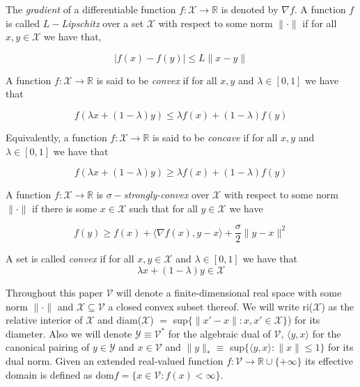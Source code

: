 The \textit{gradient} of a differentiable function $f: \mathcal{X} \to \mathbb{R}$ is denoted by $\nabla f$. A function $f$ is called $L-$\textit{Lipschitz} over a set $\mathcal{X}$ with respect to some norm $\|\cdot\|$ if for all $x,y \in \mathcal{X}$ we have that, 

\begin{equation*}
    |f(x) - f(y)| \le L\|x - y\|
\end{equation*}

A function $f:\mathcal{X} \to \mathbb{R}$ is said to be \textit{convex} if for all $x,y$ and $\lambda \in [0,1]$ we have that 

\begin{equation*}
    f(\lambda x + (1-\lambda)y) \le \lambda f(x) + (1-\lambda)f(y)
\end{equation*}

Equivalently, a function $f:\mathcal{X} \to \mathbb{R}$ is said to be \textit{concave} if for all $x,y$ and $\lambda \in [0,1]$ we have that 

\begin{equation*}
    f(\lambda x + (1-\lambda)y) \ge \lambda f(x) + (1-\lambda)f(y)
\end{equation*}

A function $f:\mathcal{X} \to \mathbb{R}$ is $\sigma-$\textit{strongly-convex} over $\mathcal{X}$ with respect to some norm $\|\cdot\|$ if there is some $x \in \mathcal{X}$ such that for all $y \in \mathcal{X}$ we have 

\begin{equation*}
    f(y) \ge f(x) + \langle\nabla f(x),y - x\rangle + \frac{\sigma}{2}\|y - x\|^2
\end{equation*}

A set is called \textit{convex} if for all $x,y \in \mathcal{X}$ and $\lambda \in [0,1]$ we have that 
\begin{equation*}
    \lambda x + (1-\lambda)y \in \mathcal{X} 
\end{equation*}

Throughout this paper $\mathcal{V}$ will denote a finite-dimensional real space with some norm $\|\cdot\|$ and $\mathcal{X} \subseteq \mathcal{V}$ a closed convex subset thereof. We will write ri($\mathcal{X}$) as the relative interior of $\mathcal{X}$ and diam($\mathcal{X}$) $ = $ sup$\{\|x'-x\|: x,x' \in \mathcal{X}\}$) for its diameter. Also we will denote $\mathcal{Y} \equiv \mathcal{V}^*$ for the algebraic dual of $\mathcal{V}$, $\langle y,x \rangle$ for the canonical pairing of $y \in \mathcal{Y}$ and $x \in \mathcal{V}$ and $\|y\|_* \equiv $ sup$\{\langle y,x \rangle: \|x\| \le 1\}$ for its dual norm. Given an extended real-valued function $f: \mathcal{V} \to \mathbb{R} \cup \{+\infty\}$ its effective domain is defined as dom$f = \{x \in \mathcal{V} : f(x) < \infty\}$.


